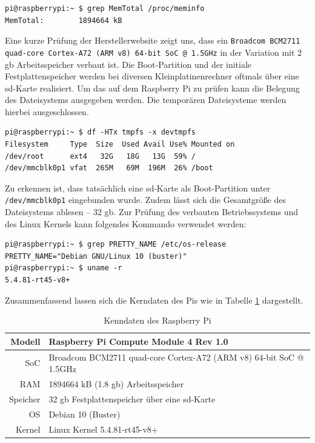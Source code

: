 \begin{lstlisting}[label=lst:pi-ram]
pi@raspberrypi:~ $ grep MemTotal /proc/meminfo
MemTotal:        1894664 kB
\end{lstlisting}

\noindent Eine kurze Prüfung der Herstellerwebsite zeigt uns, dass ein \texttt{Broadcom BCM2711 quad-\allowbreak core Cortex-\allowbreak A72 (ARM v8) 64-bit SoC @ 1.5GHz}
in der Variation mit \num{2} \gls{gb} Arbeitsspeicher verbaut ist.
Die Boot-Partition und der initiale Festplattenspeicher werden bei diversen Kleinplatinenrechner oftmals über eine \gls{sd}-Karte
realisiert.
Um das auf dem Raspberry Pi zu prüfen kann die Belegung des Dateisystems ausgegeben werden.
Die temporären Dateisysteme werden hierbei ausgeschlossen.

\begin{lstlisting}[label=lst:pi-sd]
pi@raspberrypi:~ $ df -HTx tmpfs -x devtmpfs
Filesystem     Type  Size  Used Avail Use% Mounted on
/dev/root      ext4   32G   18G   13G  59% /
/dev/mmcblk0p1 vfat  265M   69M  196M  26% /boot
\end{lstlisting}

\noindent Zu erkennen ist, dass tatsächlich eine \gls{sd}-Karte als Boot-Partition unter \texttt{/dev/mmcblk0p1} eingebunden wurde.
Zudem lässt sich die Gesamtgröße des Dateisystems ablesen -- \num{32} \gls{gb}.
Zur Prüfung des verbauten Betriebssystems und des Linux Kernels kann folgendes Kommando verwendet werden:

\begin{lstlisting}[label=lst:pi-os]
pi@raspberrypi:~ $ grep PRETTY_NAME /etc/os-release
PRETTY_NAME="Debian GNU/Linux 10 (buster)"
pi@raspberrypi:~ $ uname -r
5.4.81-rt45-v8+
\end{lstlisting}

\noindent Zusammenfassend lassen sich die Kerndaten des Pis wie in Tabelle \ref{tab:data-raspi} dargestellt.

\begin{table}[h]
    \centering
    \begin{tabularx}{\textwidth}{|r|X|}
        \hline
        Modell   & Raspberry Pi Compute Module 4 Rev 1.0                              \\ \hline
        SoC      & Broadcom BCM2711 quad-core Cortex-A72 (ARM v8) 64-bit SoC @ 1.5GHz \\ \hline
        RAM      & \num{1894664} kB (\num{1,8} \gls{gb}) Arbeitsspeicher              \\ \hline
        Speicher & \num{32} \gls{gb} Festplattenspeicher über eine \gls{sd}-Karte     \\ \hline
        OS       & Debian 10 (Buster)                                                 \\ \hline
        Kernel   & Linux Kernel 5.4.81-rt45-v8+                                       \\ \hline
    \end{tabularx}\caption{Kenndaten des Raspberry Pi}\label{tab:data-raspi}
\end{table}

